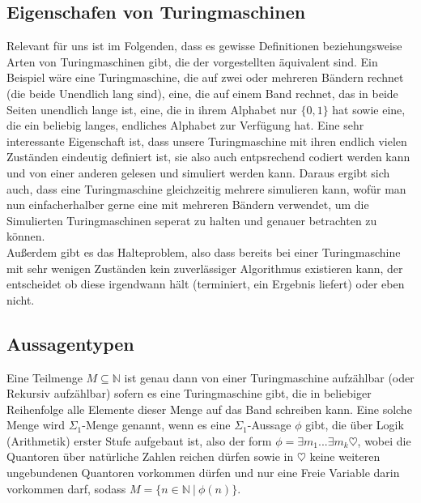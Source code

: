 \documentclass{scrartcl}
\begin{document}
\subsection{Eigenschafen von Turingmaschinen}
Relevant für uns ist im Folgenden, dass es gewisse Definitionen beziehungsweise
Arten von Turingmaschinen gibt, die der vorgestellten äquivalent sind. Ein
Beispiel wäre eine Turingmaschine, die auf zwei oder mehreren Bändern rechnet
(die beide Unendlich lang sind), eine, die auf einem Band rechnet, das in beide
Seiten unendlich lange ist, eine, die in ihrem Alphabet nur $\{0, 1\}$ hat sowie
eine, die ein beliebig langes, endliches Alphabet zur Verfügung hat. Eine sehr
interessante Eigenschaft ist, dass unsere Turingmaschine mit ihren endlich
vielen Zuständen eindeutig definiert ist, sie also auch entpsrechend codiert
werden kann und von einer anderen gelesen und simuliert werden kann. Daraus
ergibt sich auch, dass eine Turingmaschine gleichzeitig mehrere simulieren kann,
wofür man nun einfacherhalber gerne eine mit mehreren Bändern verwendet, um die
Simulierten Turingmaschinen seperat zu halten und genauer betrachten zu können. \\
Außerdem gibt es das Halteproblem, also dass bereits bei einer Turingmaschine
mit sehr wenigen Zuständen kein zuverlässiger Algorithmus existieren kann, der
entscheidet ob diese irgendwann hält (terminiert, ein Ergebnis liefert) oder
eben nicht.


\subsection{Aussagentypen}
Eine Teilmenge $M \subseteq \mathbb{N}$ ist genau dann von einer Turingmaschine
aufzählbar (oder Rekursiv aufzählbar) sofern es eine Turingmaschine gibt, die
in beliebiger Reihenfolge alle Elemente dieser Menge auf das Band schreiben
kann. Eine solche Menge wird $\Sigma_1$-Menge genannt, wenn es eine
$\Sigma_1$-Aussage $\phi$ gibt, die über Logik (Arithmetik) erster Stufe
aufgebaut ist, also der form $\phi = \exists m_1...\exists m_k \heartsuit$,
wobei die Quantoren über natürliche Zahlen reichen dürfen sowie in $\heartsuit$
keine weiteren ungebundenen Quantoren vorkommen dürfen und nur eine Freie
Variable darin vorkommen darf, sodass $M = \{n \in \mathbb{N}\ |\ \phi(n)\}$.
\end{document}

